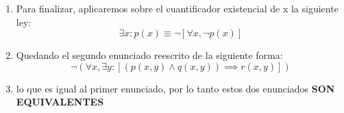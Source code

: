 \documentclass[../main.tex]{subfiles}
\begin{document}
\begin{enumerate}
    \item Para finalizar, aplicaremos sobre el cuantificador existencial de x la siguiente ley:
    \begin{equation*}
        \exists x : p(x) \equiv \neg[\forall x, \neg p(x)]
    \end{equation*}
    
    \item Quedando el segundo enunciado reescrito de la siguiente forma:
    \begin{equation*}
        \neg ( \forall x, \exists y: [ (p(x,y) \land q(x,y)) \implies r(x,y) ] )
    \end{equation*}
    
    \item lo que es igual al primer enunciado, por lo tanto estos dos enunciados \textbf{SON EQUIVALENTES}
    
\end{enumerate}
\end{document}
